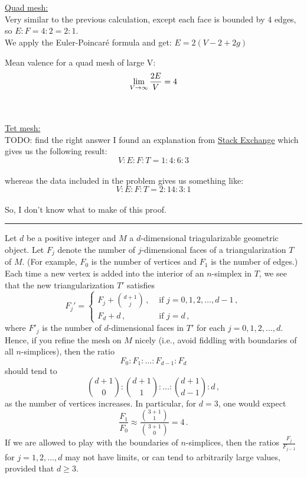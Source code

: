 \documentclass{article}
\begin{document}
\vspace{1.8cm}
\\\\

\underline{Quad mesh:}\\
Very similar to the previous calculation, except each face is bounded by 4 edges, so $E:F = 4:2 = 2:1$.\\
We apply the Euler-Poincaré formula and get: $E = 2(V-2+2g)$

Mean valence for a quad mesh of large V:\\
\begin{equation}
    \lim_{V\to\infty} \frac{2E}{V} = 4
    \notag
\end{equation}

\vspace{1.8cm}
\\\\

\underline{Tet mesh:}\\
TODO: find the right answer
I found an explanation from \href{https://math.stackexchange.com/q/1879347}{Stack Exchange} which gives us the following result:\\
$$V:E:F:T = 1:4:6:3$$ \\
whereas the data included in the problem gives us something like:\\
$$V:E:F:T = 2:14:3:1$$ \\
So, I don't know what to make of this proof.\\
\par\noindent\rule{0.25\textwidth}{0.4pt}


Let $d$ be a positive integer and $M$ a $d$-dimensional triagularizable geometric object.  Let $F_j$ denote the number of $j$-dimensional faces of a triangularization $T$ of $M$.  (For example, $F_0$ is the number of vertices and $F_1$ is the number of edges.)  Each time a new vertex is added into the interior of an $n$-simplex in $T$, we see that the new triangularization $T'$ satisfies
$$
F_j'=
\begin{cases}
    F_j+\binom{d+1}{j}\,,&\text{ if }j=0,1,2,\ldots,d-1\,,\\
    F_d+d\,,&\text{ if }j=d\,,
\end{cases}
$$
where $F'_j$ is the number of $d$-dimensional faces in $T'$ for each $j=0,1,2,\ldots,d$.  Hence, if you refine the mesh on $M$ nicely (i.e., avoid fiddling with boundaries of all $n$-simplices), then the ratio
$$F_0:F_1:\ldots:F_{d-1}:F_d$$
should tend to
$$\binom{d+1}{0}:\binom{d+1}{1}:\ldots:\binom{d+1}{d-1}:d\,,$$
as the number of vertices increases.  In particular, for $d=3$, one would expect $$\frac{F_1}{F_0}\approx \frac{\binom{3+1}{1}}{\binom{3+1}{0}}=4\,.$$  If we are allowed to play with the boundaries of $n$-simplices, then the ratios $\frac{F_{j}}{F_{j-1}}$ for $j=1,2,\ldots,d$ may not have limits, or can tend to arbitrarily large values, provided that $d\geq 3$.
\end{document}
